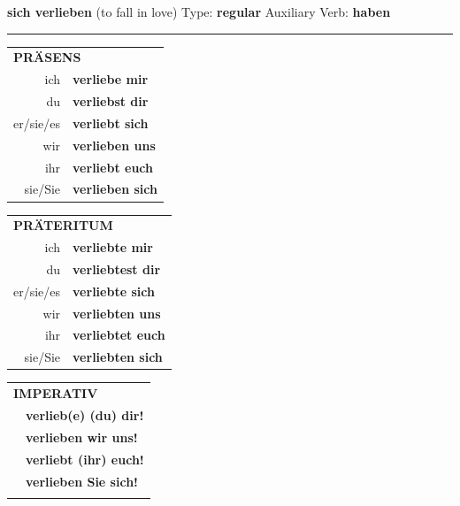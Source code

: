 \documentclass[10pt,a4paper]{revtex4-2}
\begin{document}
\begin{verbbox}
        {\Large \bf sich verlieben} (to fall in love) \hfill Type: \textbf{regular} \hfill Auxiliary Verb: \textbf{haben} 
    
       \vspace{5pt}

    \hrule
    
    \vspace{5pt}

  \begin{tabular}{rl}
     \multicolumn{2}{l}{\textbf{PRÄSENS} }\\
    ich & \textbf{verliebe mir}\\
    du & \textbf{verliebst dir}\\
    er/sie/es & \textbf{verliebt sich}\\
    wir & \textbf{verlieben uns}\\
    ihr & \textbf{verliebt euch}\\
    sie/Sie & \textbf{verlieben sich}\\
  \end{tabular}
  \hfill
     \begin{tabular}{rl}
    \multicolumn{2}{l}{\textbf{PRÄTERITUM} }\\
    ich & \textbf{verliebte mir}\\
    du & \textbf{verliebtest dir}\\
    er/sie/es & \textbf{verliebte sich}\\
    wir & \textbf{verliebten uns}\\
    ihr & \textbf{verliebtet euch}\\
    sie/Sie & \textbf{verliebten sich}\\
  \end{tabular}
  \hfill
  \begin{tabular}{rl}
     \multicolumn{2}{l}{\textbf{IMPERATIV} }\\
   & \textbf{verlieb(e) (du) dir!}\\
   & \textbf{verlieben wir uns!}\\
   & \textbf{verliebt (ihr) euch!}\\
   & \textbf{verlieben Sie sich!}\\
   & \vspace{10pt}
  \end{tabular}

    \vspace{10pt}


\end{verbbox}
\end{document}

